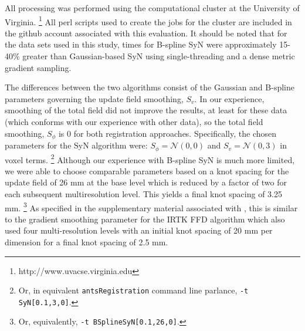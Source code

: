 \documentclass{frontiersSCNS}
\begin{document}
All processing was performed using the computational cluster at the 
University of Virginia.%
\footnote{
http://www.uvacse.virginia.edu
}
All perl scripts used to create the jobs for the cluster are
included in the github account associated with this evaluation.  
It should be noted that for the
data sets used in this study, times for B-spline SyN were approximately 
15-40\% greater than Gaussian-based SyN using single-threading and a dense
metric gradient sampling.

The differences between the two algorithms consist of the Gaussian and 
B-spline parameters governing the update field smoothing, $S_v$.  In our 
experience, smoothing of the total field did not improve the results, at
least for these data (which conforms with our experience with other
data), so the total field smoothing, $S_{\phi}$ is 0 for
both registration approaches.  Specifically, the chosen parameters
for the SyN algorithm were:  $S_{\phi} = \mathcal{N}(0,0)$ and 
$S_{v} = \mathcal{N}(0,3)$ in voxel terms.%
\footnote{
 Or, in equivalent {\tt antsRegistration} command line parlance, {\tt -t
 SyN[0.1,3,0]}.
 }  Although our experience with B-spline SyN is much more limited, we 
were able to choose comparable parameters based on a knot spacing
for the update field of 26 mm at the base level which is reduced by
a factor of two for each subsequent multiresolution level.  This 
yields a final knot spacing of 3.25 mm.%
\footnote{
 Or, equivalently, {\tt -t
 BSplineSyN[0.1,26,0]}.
 }
As specified in the supplementary material associated with \cite{klein2009}, 
this is similar to the 
gradient smoothing parameter for the IRTK FFD algorithm
which also used four multi-resolution levels with an initial knot spacing of
20 mm per dimension for a final knot spacing of 2.5 mm.  
\end{document}
